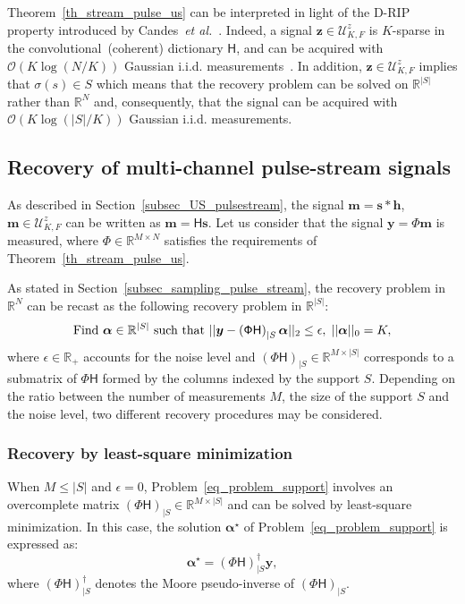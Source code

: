 \documentclass{article}
\newcommand{\etal}{\textit{et al.}}
\newcommand{\vect}[1]{\bm{#1}}
\newcommand{\mat}[1]{\mathsf{#1}}
\theoremstyle{definition}
\begin{document}
Theorem~\ref{th_stream_pulse_us} can be interpreted in light of the D-RIP property introduced by Candes~\etal{}~\cite{candes11}. 
Indeed, a signal $\vect{z} \in \mathcal{U}^z_{K,F}$ is $K$-sparse in the convolutional~(coherent) dictionary $\mat{H}$, and can be acquired with $\mathcal{O} \left(K \log \left(N / K\right)\right)$ Gaussian i.i.d. measurements~\cite{candes11}. 
In addition, $\vect{z} \in \mathcal{U}^z_{K,F}$ implies that $\sigma \left(s\right) \in S$ which means that the recovery problem can be solved on $\mathbb{R}^{|S|}$ rather than $\mathbb{R}^N$ and, consequently, that the signal can be acquired with $\mathcal{O} \left(K \log \left(|S| / K\right)\right)$ Gaussian i.i.d. measurements. 

\subsection{Recovery of multi-channel pulse-stream signals}
\label{subsec_recovery_pulse_stream}
As described in Section~\ref{subsec_US_pulsestream}, the signal $\vect{m} = \vect{s} \ast \vect{h}$, $\vect{m} \in \mathcal{U}^z_{K,F}$ can be written as $\vect{m} = \mat{H} \vect{s}$. 
Let us consider that the signal $\vect{y} = \mat{\Phi} \vect{m}$ is measured, where $\mat{\Phi} \in \mathbb{R}^{M \times N}$ satisfies the requirements of Theorem~\ref{th_stream_pulse_us}. 

As stated in Section~\ref{subsec_sampling_pulse_stream}, the recovery problem in $\mathbb{R}^N$ can be recast as the following recovery problem in $\mathbb{R}^{|S|}$:
\begin{equation}
\label{eq_problem_support}
\textnormal{Find } \vect{\alpha} \in \mathbb{R}^{|S|} \textnormal{ such that } || \vect{y} - \left(\mat{\Phi H}\right)_{|S}\vect{\alpha}||_2 \leq \epsilon, \; || \vect{\alpha} ||_0 = K, 
\end{equation}
where $\epsilon \in \mathbb{R}_{+}$ accounts for the noise level and $\left(\mat{\Phi H}\right)_{|S} \in \mathbb{R}^{M \times |S|}$ corresponds to a submatrix of $\mat{\Phi H}$ formed by the columns indexed by the support $S$. 
Depending on the ratio between the number of measurements $M$, the size of the support $S$ and the noise level, two different recovery procedures may be considered.
\subsubsection{Recovery by least-square minimization}
\label{subsec_ls_recovery}
When $M \leq |S|$ and $\epsilon=0$, Problem~\eqref{eq_problem_support} involves an overcomplete matrix $\left(\mat{\Phi H}\right)_{|S} \in \mathbb{R}^{M \times |S|}$ and can be solved by least-square minimization. 
In this case, the solution $\vect{\alpha}^\star$ of Problem~\eqref{eq_problem_support} is expressed as:
\begin{equation}
\label{eq_solution_LS}
	\vect{\alpha}^\star = \left(\mat{\Phi H}\right)_{|S}^\dagger  \vect{y},
\end{equation}
where $\left(\mat{\Phi H}\right)_{|S}^\dagger$ denotes the Moore pseudo-inverse of $\left(\mat{\Phi H}\right)_{|S}$.
\end{document}
